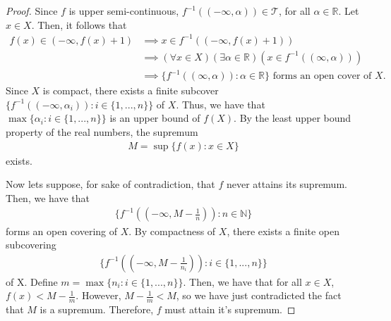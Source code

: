 \documentclass[10pt,a4paper]{article}
\theoremstyle{theorem}
\theoremstyle{definition}
\newcommand{\Tau}{\mathcal{T}}
\begin{document}
\begin{proof}
Since $f$ is upper semi-continuous, $f^{-1}((-\infty, \alpha)) \in \Tau$, for all $\alpha \in \mathbb{R}$.  Let $x \in X$. Then,  it follows that 
\begin{align*}
f(x) \in (-\infty,f(x) + 1) &\implies x \in f^{-1}((-\infty,f(x) + 1))\\
&\implies (\forall x \in X)(\exists \alpha \in \mathbb{R})(x \in f^{-1}((\infty, \alpha)))\\
&\implies \{f^{-1}((\infty, \alpha)): \alpha \in \mathbb{R} \} \text{ forms an open cover of } X.
\end{align*}
Since $X$ is compact, there exists a finite subcover $\{f^{-1}((-\infty, \alpha_i)): i \in \{1,...,n\} \}$ of $X$. Thus, we have that $\max \{\alpha_i: i \in \{1,...,n\} \}$ is an upper bound of $f(X)$. By the least upper bound property of the real numbers, the supremum
\begin{align*}
M = \sup\{f(x): x \in X \}
\end{align*}
exists.

Now lets suppose, for sake of contradiction, that $f$ never attains its supremum. Then, we have that 
\begin{align*}
\{f^{-1}((-\infty, M - \frac{1}{n})): n \in \mathbb{N}\}
\end{align*}
forms an open covering of $X$. By compactness of $X$, there exists a finite open subcovering
\begin{align*}
\{f^{-1}((-\infty, M - \frac{1}{n_i})): i \in \{1, ..., n\} \}
\end{align*}
of X. Define $m = \max\{n_i:  i \in \{1, ..., n\}\}$. Then, we have that for all $x \in X$, $f(x) < M - \frac{1}{m}$. However, $M - \frac{1}{m} < M$, so we have just contradicted the fact that $M$ is a supremum. Therefore, $f$ must attain it's supremum.
\end{proof}
\end{document}
